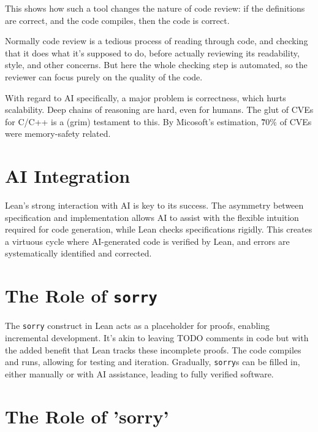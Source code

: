 \documentclass{article}
\begin{document}
This shows how such a tool changes the nature of code review: if the definitions are correct, and the code compiles, then the code is correct.

Normally code review is a tedious process of reading through code, and checking that it does what it's supposed to do, before actually reviewing its readability, style, and other concerns. But here the whole checking step is automated, so the reviewer can focus purely on the quality of the code.

With regard to AI specifically, a major problem is correctness, which hurts scalability. Deep chains of reasoning are hard, even for humans. The glut of CVEs for C/C++ is a (grim) testament to this. By Micosoft's estimation, \~ 70\% of CVEs were memory-safety related.



\section{AI Integration}

Lean's strong interaction with AI is key to its success. The asymmetry between specification and implementation allows AI to assist with the flexible intuition required for code generation, while Lean checks specifications rigidly. This creates a virtuous cycle where AI-generated code is verified by Lean, and errors are systematically identified and corrected.

\section{The Role of \texttt{sorry}}

The \texttt{sorry} construct in Lean acts as a placeholder for proofs, enabling incremental development. It's akin to leaving TODO comments in code but with the added benefit that Lean tracks these incomplete proofs. The code compiles and runs, allowing for testing and iteration. Gradually, \texttt{sorry}s can be filled in, either manually or with AI assistance, leading to fully verified software.

\section{The Role of 'sorry'}
\end{document}
